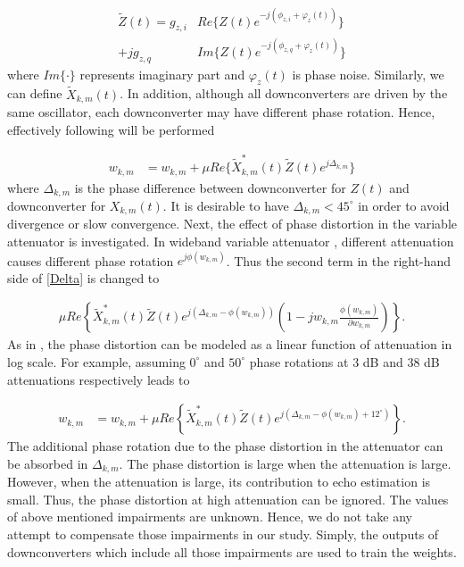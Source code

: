 \documentclass[twocolumn]{IEEEtran}
\begin{document}
\begin{align}
\widetilde{Z}(t)= g_{z,i}&Re\{ Z(t) e^{-j
(\phi_{z,i}+\varphi_z(t))}\} \nonumber \\
+ jg_{z,q}&Im\{ Z(t) e^{-j (\phi_{z,q} +\varphi_z(t)) }\}
\end{align}
where $Im\{\cdot\}$ represents
imaginary part and $\varphi_z(t)$ is phase noise. Similarly, we can
define $\widetilde{X}_{k,m}(t)$. In addition, although all
downconverters are driven by the same oscillator, each downconverter
may have different phase rotation. Hence, effectively following will
be performed

\begin{align}
w_{k,m}&=w_{k,m}+ \mu Re\{ \widetilde{X}_{k,m}^*(t) \widetilde{Z}(t)
e^{j\Delta_{k,m}}\} \label{Delta}
\end{align}
where $\Delta_{k,m}$ is the phase difference between downconverter
for $Z(t)$ and downconverter for $X_{k,m}(t)$. It is desirable to
have $\Delta_{k,m}<45^\circ$ in order to avoid divergence or slow
convergence. Next, the effect of phase distortion in the variable
attenuator is investigated. In wideband variable attenuator
\cite{rfmd}, different attenuation causes different phase rotation
$e^{j\phi(w_{k,m})}$. Thus the second term in the right-hand side of
\eqref{Delta} is changed to

\begin{align}
\mu Re\left \{ \widetilde{X}_{k,m}^*(t) \widetilde{Z}(t)
e^{j(\Delta_{k,m}-\phi(w_{k,m}))}\left (1-jw_{k,m}
\frac{\phi(w_{k,m})} {\partial w_{k,m} } \right) \right\}.
\end{align}
As in \cite{rfmd}, the phase distortion can be modeled as a linear
function of attenuation in log scale. For example, assuming
$0^\circ$ and $50^\circ$ phase rotations at 3 dB and 38 dB
attenuations respectively leads to

\begin{align}\label{weightC}
w_{k,m}&=w_{k,m}+ \mu Re\left \{ \widetilde{X}_{k,m}^*(t)
\widetilde{Z}(t) e^{j\left (\Delta_{k,m}-\phi(w_{k,m})+12^\circ
\right)} \right\}.
\end{align}
The additional phase rotation due to the phase distortion in the
attenuator can be absorbed in $\Delta_{k,m}$. The phase distortion
is large when the attenuation is large. However, when the
attenuation is large, its contribution to echo estimation is small.
Thus, the phase distortion at high attenuation can be ignored. The
values of above mentioned impairments are unknown. Hence, we do not
take any attempt to compensate those impairments in our study.
Simply, the outputs of downconverters which include all those
impairments are used to train the weights.
\end{document}
